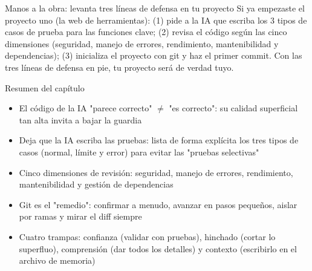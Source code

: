 \begin{tcbpractice}{Manos a la obra: levanta tres líneas de defensa en tu proyecto}
Si ya empezaste el proyecto uno (la web de herramientas): (1) pide a la IA que escriba los 3 tipos de casos de prueba para las funciones clave; (2) revisa el código según las cinco dimensiones (seguridad, manejo de errores, rendimiento, mantenibilidad y dependencias); (3) inicializa el proyecto con git y haz el primer commit. Con las tres líneas de defensa en pie, tu proyecto será de verdad tuyo.

\end{tcbpractice}

\begin{tcbsummary}{Resumen del capítulo}
\begin{itemize}
  \item El código de la IA "parece correcto" $\neq$ "es correcto": su calidad superficial tan alta invita a bajar la guardia
  \item Deja que la IA escriba las pruebas: lista de forma explícita los tres tipos de casos (normal, límite y error) para evitar las "pruebas selectivas"
  \item Cinco dimensiones de revisión: seguridad, manejo de errores, rendimiento, mantenibilidad y gestión de dependencias
  \item Git es el "remedio": confirmar a menudo, avanzar en pasos pequeños, aislar por ramas y mirar el diff siempre
  \item Cuatro trampas: confianza (validar con pruebas), hinchado (cortar lo superfluo), comprensión (dar todos los detalles) y contexto (escribirlo en el archivo de memoria)
\end{itemize}

\end{tcbsummary}
